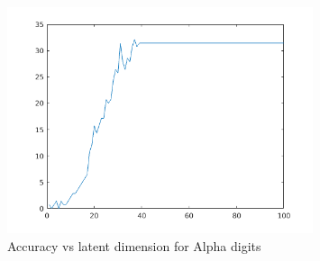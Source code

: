 \begin{figure}
\centering
  	\includegraphics[width=0.8\textwidth]{./images/accuracyAlpha.png}
  	\caption{Accuracy vs latent dimension for Alpha digits}
  	\label{T8}
\end{figure}


